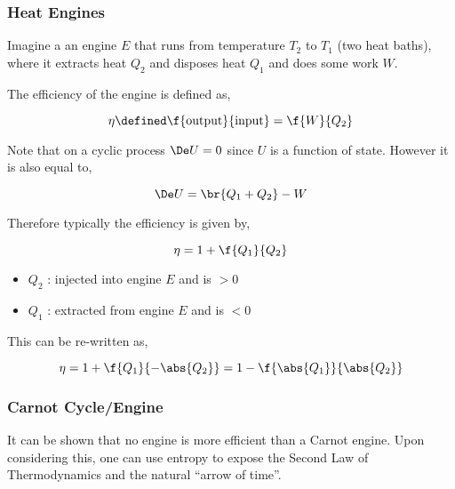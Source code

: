 \documentclass{article}
\begin{document}
\subsubsection{Heat Engines}

Imagine a an engine $E$ that runs from temperature $T_2$ to $T_1$ (two heat baths), where it extracts heat $Q_2$ and disposes heat $Q_1$ and does some work $W$.

\begin{center}
\end{center}

The efficiency of the engine is defined as,

\[ \eta \defined \f{\text{output}}{\text{input}} = \f{W}{Q_2} \]

Note that on a cyclic process $\De U = 0$ since $U$ is a function of state. However it is also equal to,

\[ \De U = \br{Q_1 + Q_2} - W \]

Therefore typically the efficiency is given by,

\[ \eta = 1 + \f{Q_1}{Q_2} \]

\begin{itemize}
  \item $Q_2$ : injected into engine $E$ and is $>0$
  \item $Q_1$ : extracted from engine $E$ and is $<0$
\end{itemize}

This can be re-written as,

\[ \eta = 1 + \f{Q_1}{-\abs{Q_2}} = 1 - \f{\abs{Q_1}}{\abs{Q_2}} \]

\subsubsection{Carnot Cycle/Engine}

It can be shown that no engine is more efficient than a Carnot engine. Upon considering this, one can use entropy to expose the Second Law of Thermodynamics and the natural ``arrow of time''.
\end{document}
